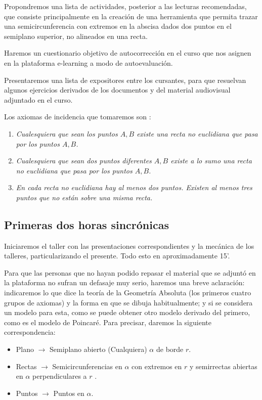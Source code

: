 \documentclass[oneside,spanish]{amsart}
\numberwithin{equation}{section}
\numberwithin{figure}{section}
\theoremstyle{definition}
\begin{document}
Propondremos una lista de actividades, posterior a las lecturas recomendadas, que consiste principalmente en la creación de una herramienta que permita trazar una semicircunferencia con extremos en la abscisa dados dos puntos en el semiplano superior, no alineados en una recta.

Haremos un cuestionario objetivo de autocorrección en el curso que nos asignen en la plataforma e-learning a modo de autoevaluación.

Presentaremos una lista de expositores entre los cursantes, para que resuelvan algunos ejercicios derivados de los documentos y del material audiovisual adjuntado en el curso.

Los axiomas de incidencia que tomaremos son \citet{sangari21}:
\begin{enumerate}[label=Ax I.\arabic{enumi}]
	\item \emph{Cualesquiera que sean los puntos $A,$$B$ existe una recta no euclidiana que pasa por los puntos $A,$$B$.}
	\item \emph{Cualesquiera que sean dos puntos diferentes $A,$$B$ existe a lo sumo una recta no euclidiana que pasa por los puntos $A,$$B$.}
	\item \emph{En cada recta no euclidiana hay al menos dos puntos. Existen al menos tres puntos que no están sobre una misma recta.}
\end{enumerate}

\subsection{Primeras dos horas sincrónicas\label{subsec:Primeras-dos-sinc}}

Iniciaremos el taller con las presentaciones correspondientes y la mecánica de los talleres, particularizando el presente. Todo esto en aproximadamente 15'.

Para que las personas que no hayan podido repasar el material que se adjuntó en la plataforma no sufran un defasaje muy serio, haremos una breve aclaración: indicaremos lo que dice la teoría de la Geometría Absoluta (los primeros cuatro grupos de axiomas) y la forma en que se dibuja habitualmente; y si se considera un modelo para esta, como se puede obtener otro modelo derivado del primero, como es el modelo de Poincaré. Para precisar, daremos la siguiente correspondencia:
\begin{itemize}
	\item Plano $\rightarrow$ Semiplano abierto (Cualquiera) $\alpha$ de borde $r$.
	\item Rectas $\rightarrow$ Semicircunferencias en $\alpha$ con extremos en $r$ y semirrectas abiertas en $\alpha$ perpendiculares a $r$ .
	\item Puntos $\rightarrow$ Puntos en $\alpha$.
\end{itemize}
\end{document}
